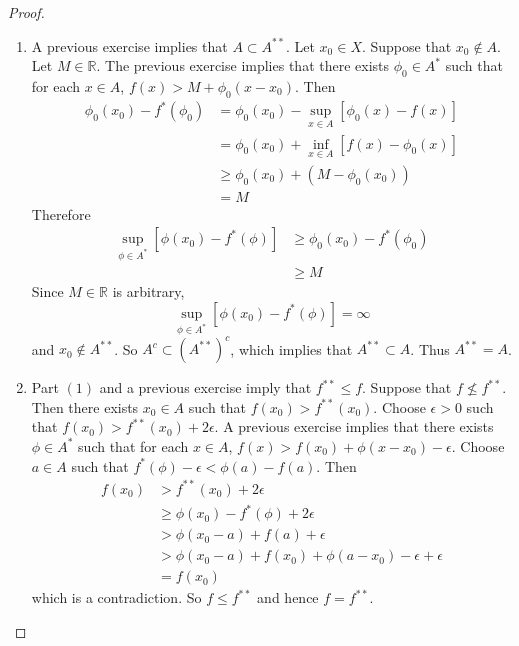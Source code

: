 \documentclass[12pt]{amsart}
\theoremstyle{definition}
\newcommand{\ep}{\epsilon}
\newcommand{\R}{\mathbb{R}}
\begin{document}
	\begin{proof}\
		\begin{enumerate}
			\item A previous exercise implies that $A \subset A^{**}$. Let $x_0 \in X$. Suppose that $x_0 \not \in A$. Let $M \in \R$. The previous exercise implies that there exists $\phi_0 \in A^*$ such that for each $x \in A$, $f(x) > M + \phi_0(x - x_0)$. Then 
			\begin{align*}
				\phi_0(x_0) - f^*(\phi_0) 
				&= \phi_0(x_0) - \sup_{x \in A}[\phi_0(x) - f(x)] \\
				&= \phi_0(x_0) + \inf_{x \in A}[f(x) - \phi_0(x)] \\
				& \geq \phi_0(x_0) + (M - \phi_0(x_0)) \\
				&= M
			\end{align*}
		Therefore 
		\begin{align*}
			\sup\limits_{\phi \in A^*}[\phi(x_0) - f^*(\phi)] 
			& \geq \phi_0(x_0) - f^*(\phi_0) \\
			& \geq M
		\end{align*}
		Since $M \in \R$ is arbitrary, $$\sup\limits_{\phi \in A^*}[\phi(x_0) - f^*(\phi)] = \infty $$ and $x_0 \not \in A^{**}$. So $A^c \subset (A^{**})^c$, which implies that $A^{**} \subset A$. Thus $A^{**} = A$.
		\item Part $(1)$ and a previous exercise imply that $f^{**} \leq f$. Suppose that $f \not \leq f^{**}$. Then there exists $x_0 \in A$ such that $f(x_0) > f^{**}(x_0)$. Choose $\ep > 0$ such that $f(x_0) > f^{**}(x_0) + 2 \ep$. A previous exercise implies that there exists $\phi \in A^*$ such that for each $x \in A$, $f(x) > f(x_0) + \phi(x - x_0) - \ep$. Choose $a \in A$ such that $f^*(\phi) - \ep < \phi(a) - f(a)$. Then 
		\begin{align*}
			f(x_0)
			& > f^{**}(x_0) + 2 \ep \\
			& \geq \phi(x_0) - f^*(\phi) + 2 \ep \\
			& > \phi(x_0 -a) + f(a) + \ep \\
			& > \phi(x_0 -a) + f(x_0) + \phi(a - x_0) - \ep + \ep \\
			&= f(x_0) 
		\end{align*}
		which is a contradiction. So $f \leq f^{**}$ and hence $f = f^{**}$. 
		\end{enumerate}
		
	\end{proof}
	

	
	
\end{document}
